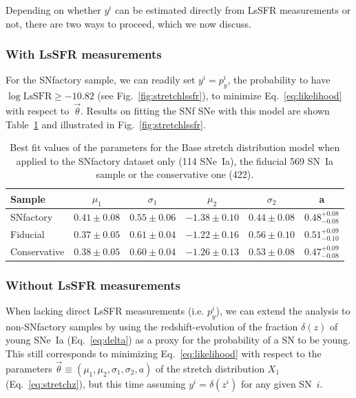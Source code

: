 \documentclass[]{aa} %
\begin{document}
Depending on whether $y^i$ can be estimated directly from LsSFR measurements or
not, there are two ways to proceed, which we now discuss.

\subsubsection{With LsSFR measurements}\label{sec:modelpy}

For the SNfactory sample, we can readily set $y^i = p_y^i$, the probability to
have $\log \mathrm{LsSFR} \geq -10.82$ (see Fig.~\ref{fig:stretchlssfr}), to
minimize Eq.~\ref{eq:likelihood} with respect to~$\vec{\theta}$. Results on
fitting the SNf SNe with this model are shown Table~\ref{tab:modelresults} and
illustrated in Fig.~\ref{fig:stretchlssfr}.

\begin{table}
    \centering
    \caption{Best fit values of the parameters for the Base stretch distribution
    model when applied to the SNfactory dataset only (114 SNe~Ia), the fiducial
569 SN~Ia sample or the conservative one (422).}
    \label{tab:modelresults}
    \begin{tabular}{lccccc}
    \hline\hline
        Sample & $\mu_1$  & $\sigma_1$
               & $\mu_2$ & $\sigma_2$
               & a \\
        \hline
        SNfactory & $0.41 \pm 0.08$ & $0.55 \pm 0.06$
                  & $-1.38 \pm 0.10$ & $0.44 \pm 0.08$
                  & $0.48^{+0.08}_{-0.08}$ \\
        Fiducial & $0.37 \pm 0.05$  & $0.61 \pm 0.04$
                 & $-1.22 \pm 0.16$ & $0.56 \pm 0.10$
                 & $0.51^{+0.09}_{-0.10}$ \\
        Conservative & $0.38 \pm 0.05$  & $0.60 \pm 0.04$
                     & $-1.26 \pm 0.13$ & $0.53 \pm 0.08$
                     & $0.47^{+0.09}_{-0.08}$ \\
        \hline
    \end{tabular}
\end{table}

\subsubsection{Without LsSFR measurements}\label{sec:modelnopy}

When lacking direct LsSFR measurements (i.e. $p_y^i$), we can extend the
analysis to non-SNfactory samples by using the redshift-evolution of the
fraction $\delta(z)$ of young SNe~Ia (Eq.~\ref{eq:delta}) as a proxy for the
probability of a SN to be young. This still corresponds to minimizing
Eq.~\ref{eq:likelihood} with respect to the parameters
$\vec{\theta}\equiv(\mu_1, \mu_2, \sigma_1, \sigma_2, a)$ of the stretch
distribution $X_1$ (Eq.~\ref{eq:stretchz}), but this time assuming $y^i =
\delta(z^i)$ for any given SN~$i$. 
\end{document}
